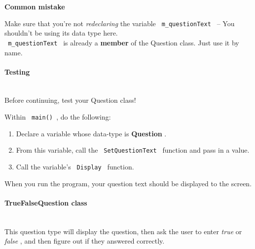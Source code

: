 \documentclass[a4paper,12pt]{book}
\begin{document}
                            
                            \begin{mdframed}[backgroundcolor=error] 
                                \textbf{ Common mistake }

                                Make sure that you're not \textit{ redeclaring }
                                the variable \texttt{ m\_questionText } -- You shouldn't
                                be using its data type here. \\

                                \texttt{ m\_questionText } is already a \textbf{ member }
                                of the Question class. Just use it by name.
                            \end{mdframed}

                            

                    \paragraph{ Testing } ~\\
                        Before continuing, test your Question class!

                        Within \texttt{ main() }, do the following:

                        \begin{enumerate}
                            \item Declare a variable whose data-type is \textbf{ Question }.
                            \item From this variable, call the \texttt{ SetQuestionText } function
                            and pass in a value.
                            \item Call the variable's \texttt{ Display } function.
                        \end{enumerate}

                        When you run the program, your question text should be displayed to the screen.

                    \newpage
                    \paragraph{ TrueFalseQuestion class } ~\\
                        This question type will display the question,
                        then ask the user to enter \textit{ true } or
                        \textit{ false }, and then figure out if they
                        answered correctly.
\end{document}
